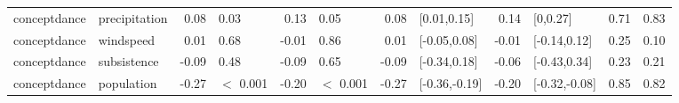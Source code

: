 \begin{table}[ht]
\begin{tabular}{llrlrlrlrlrr}
  conceptdance & precipitation & 0.08 & 0.03 & 0.13 & 0.05 & 0.08 & [0.01,0.15] & 0.14 & [0,0.27] & 0.71 & 0.83 \\ 
  conceptdance & windspeed & 0.01 & 0.68 & -0.01 & 0.86 & 0.01 & [-0.05,0.08] & -0.01 & [-0.14,0.12] & 0.25 & 0.10 \\ 
  conceptdance & subsistence & -0.09 & 0.48 & -0.09 & 0.65 & -0.09 & [-0.34,0.18] & -0.06 & [-0.43,0.34] & 0.23 & 0.21 \\ 
  conceptdance & population & -0.27 & $<$ 0.001 & -0.20 & $<$ 0.001 & -0.27 & [-0.36,-0.19] & -0.20 & [-0.32,-0.08] & 0.85 & 0.82 \\ 
   \hline
\end{tabular}
\end{table}
